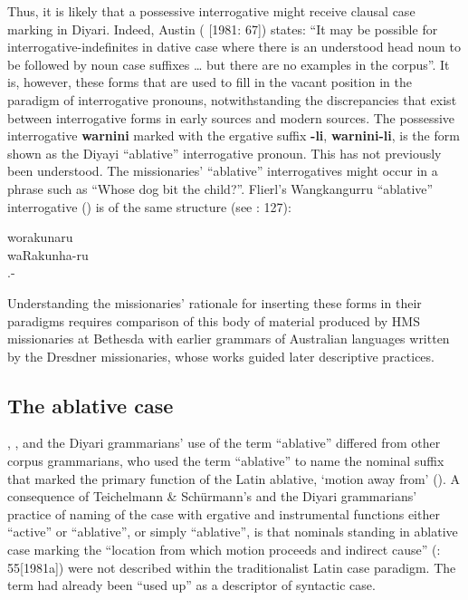Thus, it is likely that a possessive interrogative might receive clausal case marking in Diyari. Indeed, Austin (\citeyear{austin_grammar_2013} [1981: 67]) states: “It may be possible for interrogative-indefinites in dative case where there is an understood head noun to be followed by noun case suffixes … but there are no examples in the corpus”. It is, however, these forms that are used to fill in the vacant position in the paradigm of interrogative pronouns, notwithstanding the discrepancies that exist between interrogative forms in early sources and modern sources. The possessive interrogative \textbf{warnini} marked with the ergative suffix \textbf{-li},  \textbf{warnini-li}, is the form shown as the Diyayi “ablative” interrogative pronoun. This has not previously been understood. The missionaries' “ablative” interrogatives might occur in a phrase such as “Whose dog bit the child?''. Flierl’s Wangkangurru “ablative” interrogative () is of the same structure (see \citealt{hercus_grammar_1994}: 127):

\ea
worakunaru\\
\gll waRakunha-ru\\
.-\\
\z

Understanding the missionaries' rationale for inserting these forms in their paradigms requires comparison of this body of material produced by HMS missionaries at Bethesda with earlier grammars of Australian languages written by the Dresdner missionaries, whose works guided later descriptive practices.

\subsection{The ablative case}
\label{sec:key:8.6.1}\label{bkm:Ref456253920}

\citet{teichelmann_outlines_1840}, \citet{meyer_vocabulary_1843}, and the Diyari grammarians' use of the term “ablative” differed from other corpus grammarians, who used the term “ablative” to name the nominal suffix that marked the primary function of the Latin ablative, `motion away from' (). A consequence of Teichelmann \& Schürmann’s and the Diyari grammarians' practice of naming of the case with ergative and instrumental functions either “active” or “ablative'', or simply “ablative'', is that nominals standing in ablative case marking the “location from which motion proceeds and indirect cause” (\citeyear{austin_grammar_2013}: 55[1981a]) were not described within the traditionalist Latin case paradigm. The term had already been “used up” as a descriptor of syntactic case.

